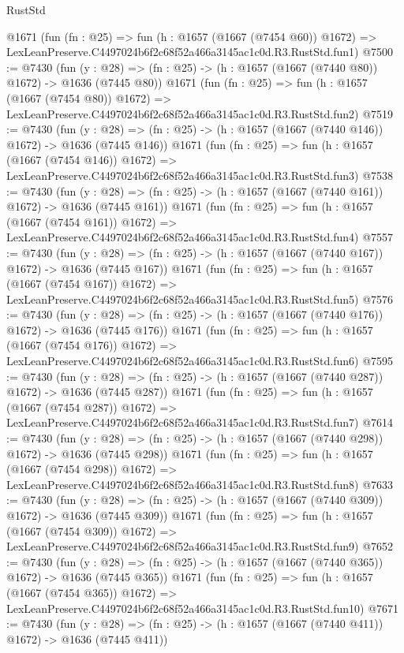 \begin{lexlean}{RustStd}
\begin{coremodule}
    @1671
    (fun (fn : @25) =>
    fun (h : @1657 (@1667 (@7454 @60)) @1672) =>
    LexLeanPreserve.C4497024b6f2c68f52a466a3145ac1c0d.R3.RustStd.fun1)
@7500 := @7430
    (fun (y : @28) => (fn : @25) -> (h : @1657 (@1667 (@7440 @80)) @1672) -> @1636 (@7445 @80))
    @1671
    (fun (fn : @25) =>
    fun (h : @1657 (@1667 (@7454 @80)) @1672) =>
    LexLeanPreserve.C4497024b6f2c68f52a466a3145ac1c0d.R3.RustStd.fun2)
@7519 := @7430
    (fun (y : @28) => (fn : @25) -> (h : @1657 (@1667 (@7440 @146)) @1672) -> @1636 (@7445 @146))
    @1671
    (fun (fn : @25) =>
    fun (h : @1657 (@1667 (@7454 @146)) @1672) =>
    LexLeanPreserve.C4497024b6f2c68f52a466a3145ac1c0d.R3.RustStd.fun3)
@7538 := @7430
    (fun (y : @28) => (fn : @25) -> (h : @1657 (@1667 (@7440 @161)) @1672) -> @1636 (@7445 @161))
    @1671
    (fun (fn : @25) =>
    fun (h : @1657 (@1667 (@7454 @161)) @1672) =>
    LexLeanPreserve.C4497024b6f2c68f52a466a3145ac1c0d.R3.RustStd.fun4)
@7557 := @7430
    (fun (y : @28) => (fn : @25) -> (h : @1657 (@1667 (@7440 @167)) @1672) -> @1636 (@7445 @167))
    @1671
    (fun (fn : @25) =>
    fun (h : @1657 (@1667 (@7454 @167)) @1672) =>
    LexLeanPreserve.C4497024b6f2c68f52a466a3145ac1c0d.R3.RustStd.fun5)
@7576 := @7430
    (fun (y : @28) => (fn : @25) -> (h : @1657 (@1667 (@7440 @176)) @1672) -> @1636 (@7445 @176))
    @1671
    (fun (fn : @25) =>
    fun (h : @1657 (@1667 (@7454 @176)) @1672) =>
    LexLeanPreserve.C4497024b6f2c68f52a466a3145ac1c0d.R3.RustStd.fun6)
@7595 := @7430
    (fun (y : @28) => (fn : @25) -> (h : @1657 (@1667 (@7440 @287)) @1672) -> @1636 (@7445 @287))
    @1671
    (fun (fn : @25) =>
    fun (h : @1657 (@1667 (@7454 @287)) @1672) =>
    LexLeanPreserve.C4497024b6f2c68f52a466a3145ac1c0d.R3.RustStd.fun7)
@7614 := @7430
    (fun (y : @28) => (fn : @25) -> (h : @1657 (@1667 (@7440 @298)) @1672) -> @1636 (@7445 @298))
    @1671
    (fun (fn : @25) =>
    fun (h : @1657 (@1667 (@7454 @298)) @1672) =>
    LexLeanPreserve.C4497024b6f2c68f52a466a3145ac1c0d.R3.RustStd.fun8)
@7633 := @7430
    (fun (y : @28) => (fn : @25) -> (h : @1657 (@1667 (@7440 @309)) @1672) -> @1636 (@7445 @309))
    @1671
    (fun (fn : @25) =>
    fun (h : @1657 (@1667 (@7454 @309)) @1672) =>
    LexLeanPreserve.C4497024b6f2c68f52a466a3145ac1c0d.R3.RustStd.fun9)
@7652 := @7430
    (fun (y : @28) => (fn : @25) -> (h : @1657 (@1667 (@7440 @365)) @1672) -> @1636 (@7445 @365))
    @1671
    (fun (fn : @25) =>
    fun (h : @1657 (@1667 (@7454 @365)) @1672) =>
    LexLeanPreserve.C4497024b6f2c68f52a466a3145ac1c0d.R3.RustStd.fun10)
@7671 := @7430
    (fun (y : @28) => (fn : @25) -> (h : @1657 (@1667 (@7440 @411)) @1672) -> @1636 (@7445 @411))

\end{coremodule}
\end{lexlean}
